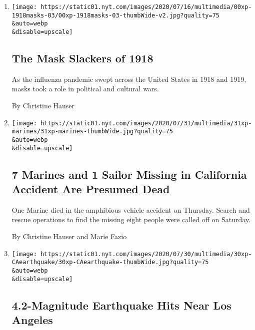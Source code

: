 \begin{enumerate}
\def\labelenumi{\arabic{enumi}.}
\item
  \href{/2020/08/03/us/mask-protests-1918.html}{}

  \texttt{[image: https://static01.nyt.com/images/2020/07/16/multimedia/00xp-1918masks-03/00xp-1918masks-03-thumbWide-v2.jpg?quality=75\\\&auto=webp\\\&disable=upscale]}

  \hypertarget{the-mask-slackers-of-1918}{%
  \subsection{The Mask Slackers of
  1918}\label{the-mask-slackers-of-1918}}

  As the influenza pandemic swept across the United States in 1918 and
  1919, masks took a role in political and cultural wars.

  By Christine Hauser
\item
  \href{/2020/07/31/us/marine-accident-california.html}{}

  \texttt{[image: https://static01.nyt.com/images/2020/07/31/multimedia/31xp-marines/31xp-marines-thumbWide.jpg?quality=75\\\&auto=webp\\\&disable=upscale]}

  \hypertarget{7-marines-and-1-sailor-missing-in-california-accident-are-presumed-dead}{%
  \subsection{7 Marines and 1 Sailor Missing in California Accident Are
  Presumed
  Dead}\label{7-marines-and-1-sailor-missing-in-california-accident-are-presumed-dead}}

  One Marine died in the amphibious vehicle accident on Thursday. Search
  and rescue operations to find the missing eight people were called off
  on Saturday.

  By Christine Hauser and Marie Fazio
\item
  \href{/2020/07/30/us/california-earthquake.html}{}

  \texttt{[image: https://static01.nyt.com/images/2020/07/30/multimedia/30xp-CAearthquake/30xp-CAearthquake-thumbWide.jpg?quality=75\\\&auto=webp\\\&disable=upscale]}

  \hypertarget{42-magnitude-earthquake-hits-near-los-angeles}{%
  \subsection{4.2-Magnitude Earthquake Hits Near Los
  Angeles}\label{42-magnitude-earthquake-hits-near-los-angeles}}


\end{enumerate}
